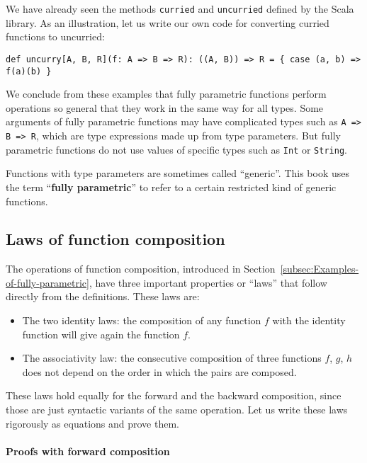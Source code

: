 We have already seen the methods \lstinline!curried! and \lstinline!uncurried!
defined by the Scala library. As an illustration, let us write our
own code for converting curried functions to uncurried:
\begin{lstlisting}
def uncurry[A, B, R](f: A => B => R): ((A, B)) => R = { case (a, b) => f(a)(b) }
\end{lstlisting}

We conclude from these examples that fully parametric functions perform
operations so general that they work in the same way for all types.
Some arguments of fully parametric functions may have complicated
types such as \lstinline!A => B => R!, which are type expressions
made up from type parameters. But fully parametric functions do not
use values of specific types such as \lstinline!Int! or \lstinline!String!.

Functions with type parameters are sometimes called ``generic''.
This book uses the term ``\textbf{fully
parametric}'' to refer to a certain restricted kind of generic functions.

\subsection{Laws of function composition\label{subsec:Laws-of-function-composition}}

The operations of function composition, introduced in Section~\ref{subsec:Examples-of-fully-parametric},
have three important properties or ``laws'' that follow directly
from the definitions. These laws are:
\begin{itemize}
\item The two identity laws:
the composition of any function $f$ with the identity function will
give again the function $f$.
\item The associativity law:
the consecutive composition of three functions $f$, $g$, $h$ does
not depend on the order in which the pairs are composed.
\end{itemize}
These laws hold equally for the forward and the backward composition,
since those are just syntactic variants of the same operation. Let
us write these laws rigorously as equations and prove them.

\paragraph{Proofs with forward composition}

